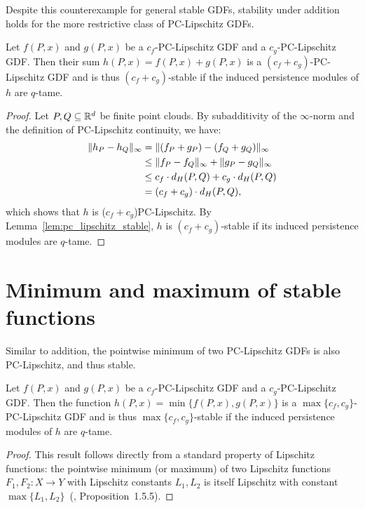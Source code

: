 Despite this counterexample for general stable GDFs, stability under addition
holds for the more restrictive class of PC-Lipschitz GDFs.
\begin{theorem}
    \label{thm:sum_pc_lipschitz}
    Let $f(P, x)$ and $g(P, x)$ be a $c_f$-PC-Lipschitz GDF and a
    $c_g$-PC-Lipschitz GDF. Then their sum $h(P, x) = f(P, x) + g(P, x)$ is
    a $(c_f + c_g)$-PC-Lipschitz GDF and is thus $(c_f + c_g)$-stable
    if the induced persistence modules of $h$ are $q$-tame.
\end{theorem}
\begin{proof}
    Let $P, Q \subseteq \mathbb{R}^d$ be finite point clouds.
    By subadditivity of the $\infty$-norm and the definition of
    PC-Lipschitz continuity, we have:
    \begin{align}
        \lVert h_P - h_Q\rVert_\infty &= \lVert(f_P + g_P) - (f_Q + g_Q)\rVert_\infty \\
        & \leq \lVert f_P - f_Q\rVert_\infty + \lVert g_P - g_Q\rVert_\infty \\
        & \leq c_f \cdot d_H(P, Q) + c_g \cdot d_H(P, Q) \\
        & = (c_f + c_g) \cdot d_H(P, Q),
    \end{align}
    which shows that $h$ is ($c_f + c_g$)PC-Lipschitz.
    By Lemma~\ref{lem:pc_lipschitz_stable}, $h$ is $(c_f + c_g)$-stable if its
    induced persistence modules are $q$-tame.
\end{proof}

\section{Minimum and maximum of stable functions}

Similar to addition, the pointwise minimum of two PC-Lipschitz GDFs is also
PC-Lipschitz, and thus stable.
\begin{theorem}
    \label{thm:min_pc_lipschitz}
    Let $f(P, x)$ and $g(P, x)$ be a $c_f$-PC-Lipschitz GDF and a
    $c_g$-PC-Lipschitz GDF.
    Then the function $h(P, x) = \min\{f(P, x), g(P, x)\}$
    is a $\max\{c_f, c_g\}$-PC-Lipschitz GDF and is thus $\max\{c_f, c_g\}$-stable
    if the induced persistence modules of $h$ are $q$-tame.
\end{theorem}
\begin{proof}
    This result follows directly from a standard property of Lipschitz
    functions: the pointwise minimum (or maximum) of two Lipschitz functions
    $F_1, F_2: X \to Y$ with Lipschitz constants $L_1, L_2$ is itself
    Lipschitz with constant $\max\{L_1, L_2\}$~(\cite{weaver2018lipschitz},
    Proposition~1.5.5).
\end{proof}

